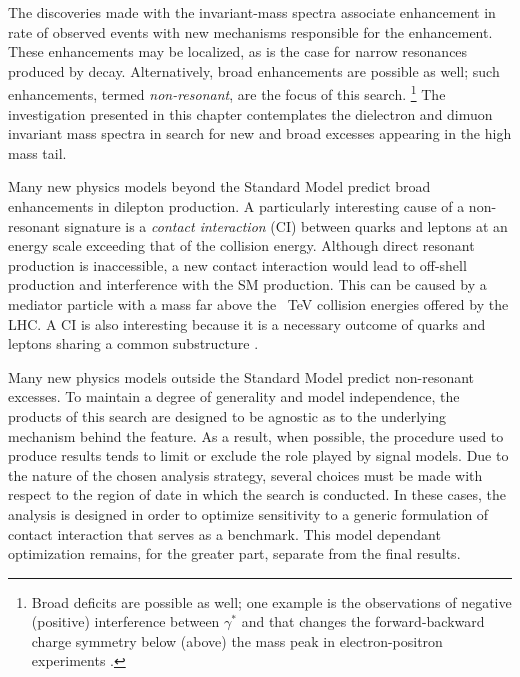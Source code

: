 The discoveries made with the invariant-mass spectra associate enhancement in rate of observed events with new mechanisms responsible for the enhancement.
These enhancements may be localized, as is the case for narrow resonances produced by \jpsi decay.
Alternatively, broad enhancements are possible as well; such enhancements, termed \emph{non-resonant}, are the focus of this search.
\footnote{Broad deficits are possible as well; one example is the observations of negative (positive) interference between $\gamma^*$ and \Z that changes the forward-backward charge symmetry below (above) the \Z mass peak in electron-positron experiments \cite{fbasym}.}
The investigation presented in this chapter contemplates the dielectron and dimuon invariant mass spectra in search for new and broad excesses appearing in the high mass tail.

Many new physics models beyond the Standard Model predict broad enhancements in dilepton production.
A particularly interesting cause of a non-resonant signature is a \emph{contact interaction} (CI) between quarks and leptons at an energy scale exceeding that of the collision energy.
Although direct resonant production is inaccessible, a new contact interaction would lead to off-shell production and interference with the SM production.
This can be caused by a mediator particle with a mass far above the ~TeV collision energies offered by the LHC.
A \qqll CI is also interesting because it is a necessary outcome of quarks and leptons sharing a common substructure \cite{eichten}.

Many new physics models outside the Standard Model predict non-resonant excesses.
To maintain a degree of generality and model independence, the products of this search are designed to be agnostic as to the underlying mechanism behind the feature.
As a result, when possible, the procedure used to produce results tends to limit or exclude the role played by signal models.
Due to the nature of the chosen analysis strategy, several choices must be made with respect to the region of date in which the search is conducted.
In these cases, the analysis is designed in order to optimize sensitivity to a generic formulation of contact interaction that serves as a benchmark.
This model dependant optimization remains, for the greater part, separate from the final results.

